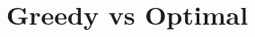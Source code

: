 \documentclass{beamer}
\begin{document}


% 
% 
% 
% 
% 
% 
% 
% 
% 
% 
% 
% 
% 
% 
% 

\section{Greedy vs Optimal}




\end{document}
